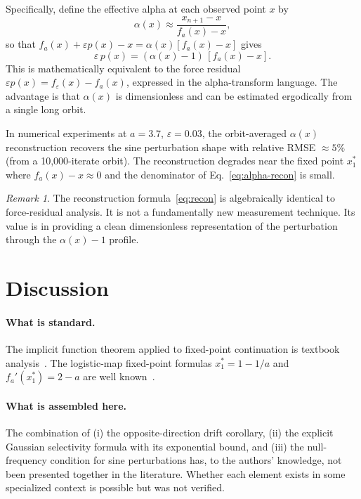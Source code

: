 \documentclass[aps,pre,twocolumn,superscriptaddress,nofootinbib,
               longbibliography,floatfix]{revtex4-2}
\newcommand{\eps}{\varepsilon}
\newcommand{\xso}{x^*_1}
\theoremstyle{plain}
\theoremstyle{remark}
\newtheorem{remark}[theorem]{Remark}
\begin{document}
Specifically, define the effective alpha at each observed point $x$
by
%
\begin{equation}
  \alpha(x) \approx \frac{x_{n+1} - x}{f_a(x) - x},
  \label{eq:alpha-recon}
\end{equation}
%
so that $f_a(x) + \eps p(x) - x = \alpha(x)[f_a(x) - x]$
gives
%
\begin{equation}
  \eps\, p(x) = (\alpha(x) - 1)\,[f_a(x) - x].
  \label{eq:recon}
\end{equation}
%
This is mathematically equivalent to the force residual
$\eps p(x) = f_\eps(x) - f_a(x)$, expressed in the
alpha-transform language.
The advantage is that $\alpha(x)$ is dimensionless and can be
estimated ergodically from a single long orbit.

In numerical experiments at $a = 3.7$, $\eps = 0.03$, the
orbit-averaged $\alpha(x)$ reconstruction recovers the
sine perturbation shape with relative RMSE $\approx 5\%$
(from a 10,000-iterate orbit).
The reconstruction degrades near the fixed point $\xso$
where $f_a(x) - x \approx 0$ and the denominator of
Eq.~\eqref{eq:alpha-recon} is small.

\begin{remark}
The reconstruction formula~\eqref{eq:recon} is algebraically
identical to force-residual analysis.
It is not a fundamentally new measurement technique.
Its value is in providing a clean dimensionless representation
of the perturbation through the $\alpha(x) - 1$ profile.
\end{remark}

\section{Discussion}
\label{sec:discussion}

\paragraph{What is standard.}
The implicit function theorem applied to fixed-point continuation
is textbook analysis~\cite{Strogatz2015}.
The logistic-map fixed-point formulas $\xso = 1-1/a$ and
$f_a'(\xso) = 2-a$ are well known~\cite{May1976}.

\paragraph{What is assembled here.}
The combination of (i) the opposite-direction drift corollary,
(ii) the explicit Gaussian selectivity formula with its
exponential bound, and (iii) the null-frequency condition
for sine perturbations has, to the authors' knowledge, not
been presented together in the literature.
Whether each element exists in some specialized context is
possible but was not verified.
\end{document}

